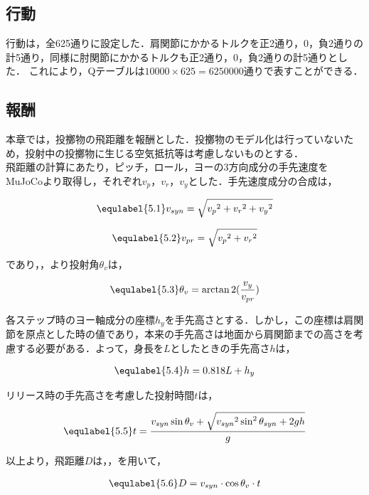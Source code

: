 \subsection{行動}
行動は，全625通りに設定した．肩関節にかかるトルクを正2通り，0，負2通りの計5通り，同様に肘関節にかかるトルクも正2通り，0，負2通りの計5通りとした．
これにより，Qテーブルは$10000 \times 625=6250000$通りで表すことができる．
\subsection{報酬}
本章では，投擲物の飛距離を報酬とした．投擲物のモデル化は行っていないため，投射中の投擲物に生じる空気抵抗等は考慮しないものとする．\\
飛距離の計算にあたり，ピッチ，ロール，ヨーの3方向成分の手先速度をMuJoCoより取得し，それぞれ$v_{p}$，$v_{r}$，$v_{y}$とした．手先速度成分の合成は，

\begin{eqnarray}
  \equlabel{5.1}
  v_{syn} = \sqrt{{v_{p}}^{2} + {v_{r}}^{2} + {v_{y}}^{2}}
\end{eqnarray}

\begin{eqnarray}
  \equlabel{5.2}
  v_{pr} = \sqrt{{v_{p}}^{2} + {v_{r}}^{2}}
\end{eqnarray}

であり，，より投射角$\theta_{v}$は，

\begin{eqnarray}
  \equlabel{5.3}
  \theta_{v} = \arctan2(\frac{v_{y}}{v_{pr}})
\end{eqnarray}

各ステップ時のヨー軸成分の座標$h_{y}$を手先高さとする．しかし，この座標は肩関節を原点とした時の値であり，本来の手先高さは地面から肩関節までの高さを考慮する必要がある．よって，身長を$L$としたときの手先高さ$h$は，

\begin{eqnarray}
  \equlabel{5.4}
  h = 0.818L + h_{y}
\end{eqnarray}

リリース時の手先高さを考慮した投射時間$t$は，

\begin{eqnarray}
  \equlabel{5.5}
  t = \frac{v_{syn}\sin\theta_{v} + \sqrt{{v_{syn}}^2\sin^2\theta_{syn} + 2gh}}{g}
\end{eqnarray}


以上より，飛距離$D$は，，を用いて，

\begin{eqnarray}
  \equlabel{5.6}
  D = v_{syn} \cdot \cos\theta_{v} \cdot t
\end{eqnarray}

